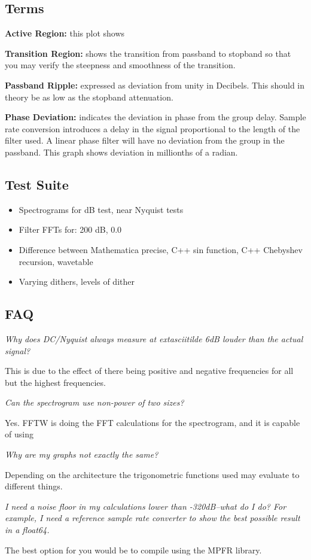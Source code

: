 \documentclass[10pt]{article}
\begin{document}
\subsection*{Terms}

\textbf{Active Region:} this plot shows 

\textbf{Transition Region:} shows the transition from passband to stopband so that you may verify the steepness and smoothness of the transition.

\textbf{Passband Ripple:} expressed as deviation from unity in Decibels. This should in theory be as low as the stopband attenuation.

\textbf{Phase Deviation:} indicates the deviation in phase from the group delay. Sample rate conversion introduces a delay in the signal proportional to the length of the filter used. A linear phase filter will have no deviation from the group in the passband. This graph shows deviation in millionths of a radian.

\subsection*{Test Suite}

\begin{itemize}
\item Spectrograms for dB test, near Nyquist tests
\item Filter FFTs for: 200 dB, 0.0
\item Difference between Mathematica precise, C++ sin function, C++ Chebyshev recursion, wavetable
\item Varying dithers, levels of dither
\end{itemize}

\subsection*{FAQ}

\emph{Why does DC\slash Nyquist always measure at 	extasciitilde 6dB louder than the actual signal?}

This is due to the effect of there being positive and negative frequencies for all but the highest frequencies.

\emph{Can the spectrogram use non-power of two sizes?}

Yes. FFTW is doing the FFT calculations for the spectrogram, and it is capable of using

\emph{Why are my graphs not exactly the same?}

Depending on the architecture the trigonometric functions used may evaluate to different things.

\emph{I need a noise floor in my calculations lower than -320dB--what do I do? For example, I need a reference sample rate converter to show the best possible result in a float64.}

The best option for you would be to compile using the MPFR library.
\end{document}
